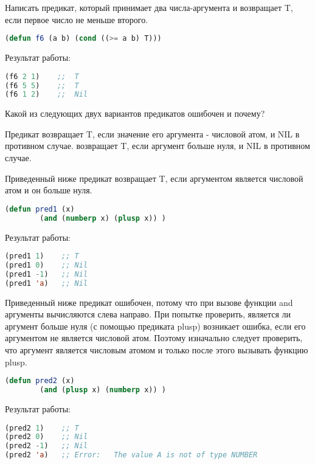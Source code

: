 \documentclass[a4paper,oneside,12pt]{extreport}
\begin{document}
\begin{task}
	Написать предикат, который принимает два числа-аргумента и возвращает T, если первое число не меньше второго.

	\begin{lstlisting}[language=Lisp]
(defun f6 (a b) (cond ((>= a b) T)))
	\end{lstlisting}


	Результат работы:
	\begin{lstlisting}[language=Lisp]
(f6 2 1)	;;  T
(f6 5 5) 	;;  T
(f6 1 2) 	;;  Nil
	\end{lstlisting}
\end{task}

\begin{task}
	Какой из следующих двух вариантов предикатов ошибочен и почему?

	Предикат  возвращает	 T, если значение его аргумента - числовой атом, и NIL в противном случае.
	 возвращает T, если аргумент больше нуля, и NIL в противном случае.

	Приведенный ниже предикат возвращает T, если аргументом является числовой атом и он больше нуля.
	\begin{lstlisting}[language=Lisp]
(defun pred1 (x)
		(and (numberp x) (plusp x)) )
	\end{lstlisting}

	Результат работы:

	\begin{lstlisting}[language=Lisp]
(pred1 1)    ;; T
(pred1 0)    ;; Nil
(pred1 -1)   ;; Nil
(pred1 'a)   ;; Nil		
	\end{lstlisting}

	Приведенный ниже предикат ошибочен, потому что при вызове функции and
	аргументы вычисляются слева направо. При попытке проверить, является ли аргумент
	больше нуля (с помощью предиката plusp) возникает ошибка, если его аргументом не
	является числовой атом. 
	Поэтому изначально следует проверить, что аргумент является числовым атомом и только после 
	этого вызывать функцию plusp. %
	\begin{lstlisting}[language=Lisp]
(defun pred2 (x)
		(and (plusp x) (numberp x)) )
	\end{lstlisting}

	Результат работы:

	\begin{lstlisting}[language=Lisp]
(pred2 1)    ;; T
(pred2 0)    ;; Nil
(pred2 -1)   ;; Nil
(pred2 'a)   ;; Error:   The value A is not of type NUMBER
	\end{lstlisting}


\end{task}
\end{document}
